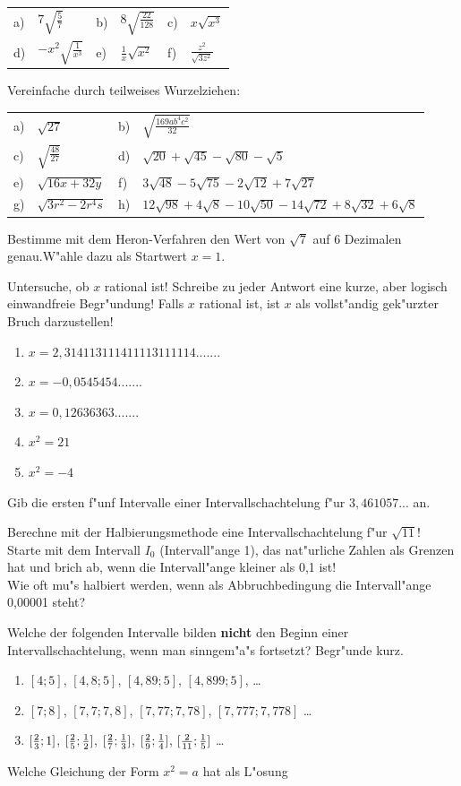 \documentclass[a4paper, twoside, parskip, 10pt, smallheadings]{scrbook}
\theoremstyle{plain}
\theoremstyle{definition}
\newcommand{\bt}{\begin{tabular}}
\newcommand{\et}{\end{tabular}}
\begin{document}
\bt{llllll}
 a) & $7\sqrt{\frac{5}{7}} $ &  b) & $8\sqrt{\frac{22}{128}} $ &  c) & $x\sqrt{x^3} $ \\
 d) & $-x^2 \sqrt{\frac{1}{x^3}} $ &  e) & $\frac{1}{x}\sqrt{x^2} $ &  f) & $\frac{z^2}{\sqrt{3z^2}} $
\et

\item Vereinfache durch teilweises Wurzelziehen:

\bt{llll}
 a) & $\sqrt{27} $ & b) & $\sqrt{\frac{169ab^4 c^2}{32}} $ \\
 c) & $\sqrt{\frac{48}{27}} $ & d) & $\sqrt{20}+\sqrt{45}-\sqrt{80}-\sqrt{5} $ \\
 e) & $\sqrt{16x+32y} $ & f) & $3\sqrt{48}-5\sqrt{75}-2\sqrt{12}+7\sqrt{27} $ \\
 g) & $\sqrt{3r^2 -2r^4 s} $ & h) & $12\sqrt{98}+4\sqrt{8}-10\sqrt{50}-14\sqrt{72}+8\sqrt{32}+6\sqrt{8} $
\et 


\item
Bestimme mit dem Heron-Verfahren den Wert von $\sqrt{7}$ auf 6 Dezimalen genau.W"ahle dazu
als Startwert $x=1$.
\item
Untersuche, ob $x$ rational ist! Schreibe zu jeder Antwort eine kurze, aber logisch einwandfreie
Begr"undung! Falls $x$ rational ist, ist $x$ als vollst"andig gek"urzter Bruch darzustellen!
\begin{enumerate}
\item $x = 2,314113111411113111114.......$
\item $x = -0,0545454.......$
\item $x = 0,12636363.......$
\item $x^2 = 21$
\item $x^2 = -4$
\end{enumerate}
\item
 Gib die ersten f"unf Intervalle einer Intervallschachtelung f"ur $3,461057...$ an.

\item
Berechne mit der Halbierungsmethode eine Intervallschachtelung f"ur $\sqrt{11}$!\\
Starte mit dem Intervall $I_0$ (Intervall"ange 1), das nat"urliche Zahlen als
Grenzen hat und brich ab, wenn die Intervall"ange kleiner als 0,1 ist!\\
Wie oft mu"s halbiert werden, wenn als Abbruchbedingung die Intervall"ange 0,00001 steht?

\item
 Welche der folgenden Intervalle bilden {\bf nicht} den Beginn einer Intervallschachtelung,
wenn man sinngem"a"s fortsetzt? Begr"unde kurz.
\begin{enumerate}
\item
$[4;5]$, $[4,8;5]$, $[4,89;5]$, $[4,899;5]$, \dots
\item
$[7;8]$, $[7,7;7,8]$, $[7,77;7,78]$, $[7,777;7,778]$ \dots
\item
$[{2\over3};1]$, $[{2\over5};{1\over 2}]$, $[{2\over7};{1\over 3}]$, $[{2\over9};{1\over 4}]$,
$[{2\over11};{1\over 5}]$ \dots
\end{enumerate}
\item
Welche Gleichung der Form $x^2=a$ hat als L"osung
\end{document}
